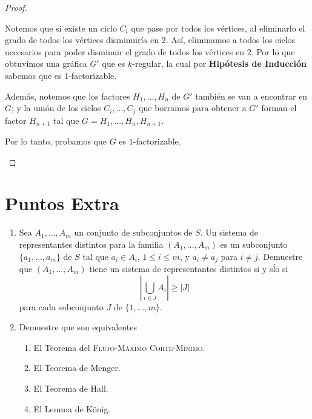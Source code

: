 \documentclass{article}
\begin{document}
\begin{enumerate}
\begin{proof}
\begin{itemize}
          Notemos que si existe un ciclo $C_{i}$ que pase por todos los vértices, al eliminarlo el grado de todos los vértices disminuiría en $2$. Así, eliminamos a todos los ciclos necesarios para poder disminuir el grado de todos los vértices en $2$. Por lo que obtuvimos una gráfica $G'$ que es $k$-regular, la cual por \textbf{Hipótesis de Inducción} sabemos que es $1$-factorizable.

          Además, notemos que los factores $H_{1}, \dots, H_{n}$ de $G'$ también se van a encontrar en $G$; y la unión de los ciclos $C_{i}, \dots, C_{j}$ que borramos para obtener a $G'$ forman el factor $H_{n + 1}$ tal que $G = H_{1}, \dots, H_{n}, H_{n + 1}$.

          Por lo tanto, probamos que $G$ es $1$-factorizable.
      \end{itemize}
    \end{proof}
\end{enumerate}

\section*{\Large{Puntos Extra}}
\begin{enumerate}
  \item Sea $A_1, \dots, A_m$ un conjunto de subconjuntos de $S$. Un sistema
    de representantes distintos para la familia $(A_1, \dots, A_m)$ es un
    subconjunto $\{ a_1, \dots, a_m \}$ de $S$ tal que $a_i \in A_i$, $1 \le i
    \le m$, y $a_i \ne a_j$ para $i \ne j$. Demuestre que $(A_1, \dots, A_m)$
    tiene un sistema de representantes distintos si y s\'lo si
    \[
      \left| \bigcup_{i \in J} A_i \right| \ge |J|
    \]
    para cada subconjunto $J$ de $\{ 1, \dots, m \}$.

  \item Demuestre que son equivalentes
    \begin{enumerate}
      \item El Teorema del \textsc{Flujo-M\'aximo Corte-M\'inimo}.

      \item El Teorema de Menger.

      \item El Teorema de Hall.

      \item El Lemma de K\"onig.
    \end{enumerate}
\end{enumerate}
\end{document}
